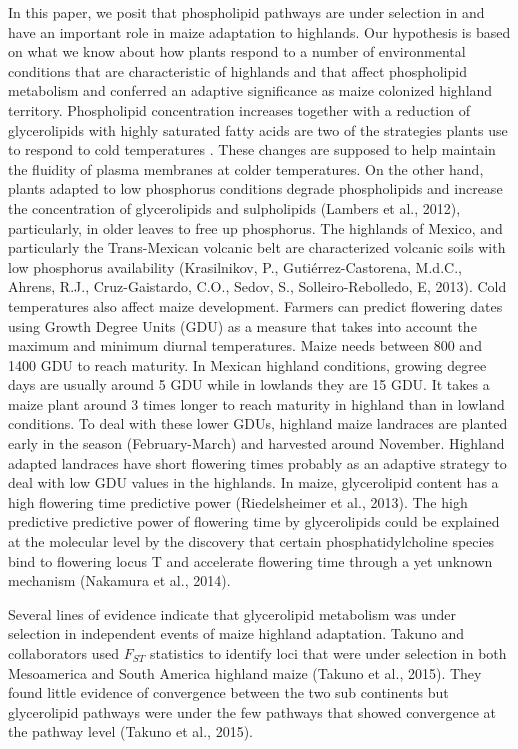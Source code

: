 \documentclass[9pt,twocolumn,twoside,lineno]{gsajnl}
\begin{document}
In this paper, we posit that phospholipid pathways are under selection in and have an important role in maize adaptation to highlands.  
Our hypothesis is based on what we know about how plants respond to a number of environmental conditions that are characteristic of highlands and that affect phospholipid metabolism and conferred an adaptive significance as maize colonized highland territory. 
Phospholipid concentration increases \citep{Degenkolbe2012-wf} together with a reduction of glycerolipids with highly saturated fatty acids \citep{Welti2002-uk} are two of the strategies plants use to respond to cold temperatures \citep{Lynch1987-ln}. 
These changes are supposed to help maintain the fluidity of plasma membranes at colder temperatures. On the other hand, plants adapted to low phosphorus conditions degrade phospholipids and increase the concentration of glycerolipids and sulpholipids (Lambers et al., 2012), particularly, in older leaves to free up phosphorus. 
The highlands of Mexico, and particularly the Trans-Mexican volcanic belt are characterized volcanic soils with low phosphorus availability (Krasilnikov, P., Gutiérrez-Castorena, M.d.C., Ahrens, R.J., Cruz-Gaistardo, C.O., Sedov, S., Solleiro-Rebolledo, E, 2013). 
Cold temperatures also affect maize development. Farmers can predict flowering dates using Growth Degree Units (GDU) as a measure  that takes into account the maximum and minimum diurnal temperatures. 
Maize needs between 800 and 1400 GDU to reach maturity. 
In Mexican highland conditions, growing degree days are usually around 5 GDU while in lowlands they are 15 GDU. %
It takes a maize plant around 3 times longer to reach maturity in highland than in lowland conditions. To deal with these lower GDUs, highland maize landraces are planted early in the season (February-March) and harvested around November. 
Highland adapted landraces have short flowering times probably as an adaptive strategy to deal with low GDU values in the highlands.  
In maize, glycerolipid content has a high flowering time predictive power (Riedelsheimer et al., 2013). 
The high predictive predictive power of flowering time by glycerolipids could be explained at the molecular level by the discovery that certain phosphatidylcholine species bind to flowering locus T and accelerate flowering time through a yet unknown mechanism (Nakamura et al., 2014). 
 
Several lines of evidence indicate that glycerolipid metabolism was under selection in independent events of maize highland adaptation. 
Takuno and collaborators used $F_{ST}$ statistics to identify loci that were under selection in both Mesoamerica and South America highland maize (Takuno et al., 2015). 
They found little evidence of convergence between the two sub continents but glycerolipid pathways were under the few pathways that showed convergence at the pathway level (Takuno et al., 2015). 
\end{document}
